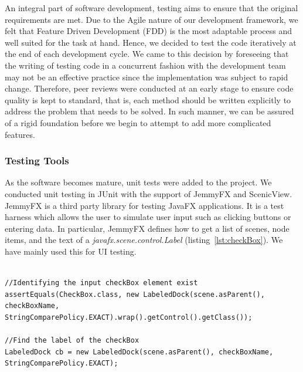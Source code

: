 An integral part of software development, testing aims to ensure that the original requirements are met. Due to the Agile nature of our development framework, we felt that Feature Driven Development (FDD) is the most adaptable process and well suited for the task at hand. Hence, we decided to test the code iteratively at the end of each development cycle. We came to this decision by foreseeing that the writing of testing code in a concurrent fashion with the development team may not be an effective practice since the implementation was subject to rapid change. Therefore, peer reviews were conducted at an early stage to ensure  code quality is kept to standard, that is, each method should be written explicitly to address the problem that needs to be solved. In such manner, we can be assured of a rigid foundation before we begin to attempt to add more complicated features.

\subsubsection*{Testing Tools}

As the software becomes mature, unit tests were added to the project. We conducted unit testing in JUnit with the support of JemmyFX and ScenicView. JemmyFX is a third party library for testing JavaFX applications. It is a test harness which allows the user to simulate user input such as clicking buttons or entering data. In particular, JemmyFX defines how to get a list of scenes, node items, and the text of a \textit{javafx.scene.control.Label} (listing~\ref{lst:checkBox}). We have mainly used this for UI testing. 


\begin{minipage}{0.9\textwidth}
	\begin{lstlisting}[caption={Use JemmyFX syntax to find a checkBox element}, label={lst:checkBox}]

//Identifying the input checkBox element exist
assertEquals(CheckBox.class, new LabeledDock(scene.asParent(), checkBoxName, StringComparePolicy.EXACT).wrap().getControl().getClass());

//Find the label of the checkBox 
LabeledDock cb = new LabeledDock(scene.asParent(), checkBoxName, StringComparePolicy.EXACT);

	\end{lstlisting}
\end{minipage}

